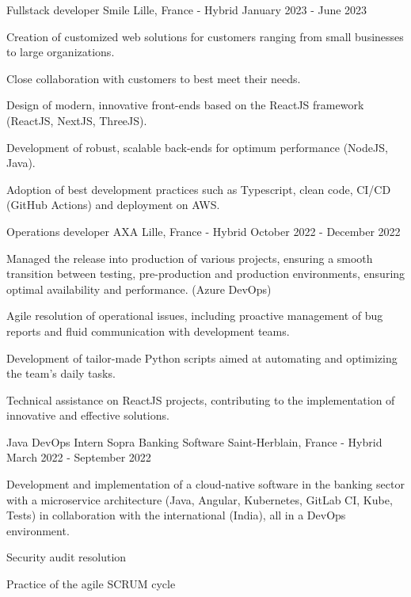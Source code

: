 \begin{cventries}
  \cventry
    {Fullstack developer} %
    {Smile} %
    {Lille, France - Hybrid} %
    {January 2023 - June 2023} %
    {
      \begin{cvitems} %
        \item {Creation of customized web solutions for customers ranging from small businesses to large organizations.}
        \item {Close collaboration with customers to best meet their needs.}
        \item {Design of modern, innovative front-ends based on the ReactJS framework (ReactJS, NextJS, ThreeJS).}
        \item {Development of robust, scalable back-ends for optimum performance (NodeJS, Java).}
        \item {Adoption of best development practices such as Typescript, clean code, CI/CD (GitHub Actions) and deployment on AWS.}
      \end{cvitems}
    }

  \cventry
    {Operations developer} %
    {AXA} %
    {Lille, France - Hybrid} %
    {October 2022 - December 2022} %
    {
      \begin{cvitems} %
        \item {Managed the release into production of various projects, ensuring a smooth transition between testing, pre-production and production environments, ensuring optimal availability and performance. (Azure DevOps)}
        \item {Agile resolution of operational issues, including proactive management of bug reports and fluid communication with development teams.}
        \item {Development of tailor-made Python scripts aimed at automating and optimizing the team's daily tasks.}
        \item {Technical assistance on ReactJS projects, contributing to the implementation of innovative and effective solutions.}
      \end{cvitems}
    }

  \cventry
    {Java DevOps Intern} %
    {Sopra Banking Software} %
    {Saint-Herblain, France - Hybrid} %
    {March 2022 - September 2022} %
    {
      \begin{cvitems} %
        \item {Development and implementation of a cloud-native software in the banking sector with a microservice architecture (Java, Angular, Kubernetes, GitLab CI, Kube, Tests) in collaboration with the international (India), all in a DevOps environment.}
        \item {Security audit resolution}
        \item {Practice of the agile SCRUM cycle}
      \end{cvitems}
    }
    

\end{cventries}
